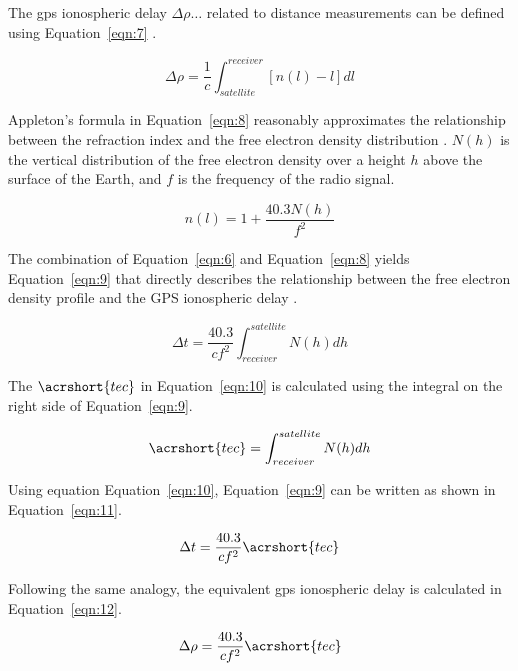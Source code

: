 \documentclass[sn-mathphys-num]{sn-jnl}%
\begin{document}
The \acrshort{gps} ionospheric delay $\Delta \rho \dots$ related to distance measurements can be defined using Equation~\ref{eqn:7} \cite{spilker1996global}.

\begin{equation}
	\Delta \rho = \frac{1}{c} \int_{satellite}^{receiver} \left[ n(l) - l \right]dl
	\label{eqn:7}
\end{equation}

Appleton’s formula in Equation~\ref{eqn:8} reasonably approximates the relationship between the refraction index and the free electron density distribution \cite{davies1990ionospheric, spilker1996global}. $N(h)$ is the vertical distribution of the free electron density over a height $h$ above the surface of the Earth, and $f$ is the frequency of the radio signal.

\begin{equation}
	n(l) = 1 + \frac{40.3 N(h)}{f^{2}}
	\label{eqn:8}
\end{equation}

The combination of Equation~\ref{eqn:6} and Equation~\ref{eqn:8} yields Equation~\ref{eqn:9} that directly describes the relationship between the free electron density profile and the GPS ionospheric delay \cite{spilker1996global}.

\begin{equation}
	\Delta t = \frac{40.3}{c f^{2}} \int_{receiver}^{satellite} N(h)dh
	\label{eqn:9}
\end{equation}

The $\acrshort{tec}$ \cite{spilker1996global} in Equation~\ref{eqn:10} is calculated using the integral on the right side of Equation~\ref{eqn:9}.

\begin{equation}
	\acrshort{tec} = \int_{receiver}^{satellite} N(h)dh
	\label{eqn:10}
\end{equation}

Using equation Equation~\ref{eqn:10}, Equation~\ref{eqn:9} can be written as shown in Equation~\ref{eqn:11}.

\begin{equation}
	\Delta t = \frac{40.3}{c f^{2}} \acrshort{tec}
	\label{eqn:11}
\end{equation}

Following the same analogy, the equivalent \acrshort{gps} ionospheric delay is calculated in Equation~\ref{eqn:12}.

\begin{equation}
	\Delta \rho = \frac{40.3}{c f^{2}} \acrshort{tec}
	\label{eqn:12}
\end{equation}
\end{document}
